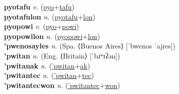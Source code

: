 \textbf{pyotafu} \textit{v.} (\hyperref[pyo]{pyo}+\hyperref[tafu]{tafu})
 \label{pyotafu} \\
\textbf{pyotafulon} \textit{n.} (\hyperref[pyotafu]{pyotafu}+\hyperref[lon]{lon})
 \label{pyotafulon} \\
\textbf{pyopowi} \textit{v.} (\hyperref[pyo]{pyo}+\hyperref[powi]{powi})
 \label{pyopowi} \\
\textbf{pyopowilon} \textit{n.} (\hyperref[pyopowi]{pyopowi}+\hyperref[lon]{lon})
 \label{pyopowilon} \\
\textbf{'pwenosayles} \textit{n.} (Spa. ⟨Buenos Aires⟩ [ˈbwenos ˈajɾes])
 \label{'pwenosayles} \\
\textbf{'pwitan} \textit{n.} (Eng. ⟨Britain⟩ [ˈbɹʷɪʔən])
 \label{'pwitan} \\
\textbf{'pwitanak} \textit{n.} (\hyperref['pwitan]{'pwitan}+\hyperref[ak]{ak})
 \label{'pwitanak} \\
\textbf{'pwitantec} \textit{n.} (\hyperref['pwitan]{'pwitan}+\hyperref[tec]{tec})
 \label{'pwitantec} \\
\textbf{'pwitantecwon} \textit{n.} (\hyperref['pwitantec]{'pwitantec}+\hyperref[won]{won})
 \label{'pwitantecwon} \\
